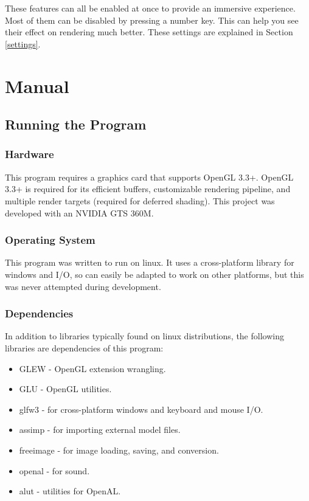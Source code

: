 \documentclass[oneside]{book}
\begin{document}
    These features can all be enabled at once to provide an immersive experience. Most of them can be disabled by pressing a number key. This can help you see their effect on rendering much better. These settings are explained in Section \ref{settings}.


\chapter{Manual}
  \section{Running the Program}
    \subsection{Hardware}
      This program requires a graphics card that supports OpenGL 3.3+.
      OpenGL 3.3+ is required for its efficient buffers, customizable rendering pipeline, and multiple render targets (required for deferred shading).
      This project was developed with an NVIDIA GTS 360M.

    \subsection{Operating System}
      This program was written to run on linux. It uses a cross-platform library for windows and I/O, so can easily be adapted to work on other platforms, but this was never attempted during development.

    \subsection{Dependencies}
      In addition to libraries typically found on linux distributions, the following libraries are dependencies of this program:
      \begin{itemize}
        \item GLEW - OpenGL extension wrangling.
        \item GLU - OpenGL utilities.
        \item glfw3 - for cross-platform windows and keyboard and mouse I/O.
        \item assimp - for importing external model files.
        \item freeimage - for image loading, saving, and conversion.
        \item openal - for sound.
        \item alut - utilities for OpenAL.
      \end{itemize}
\end{document}
